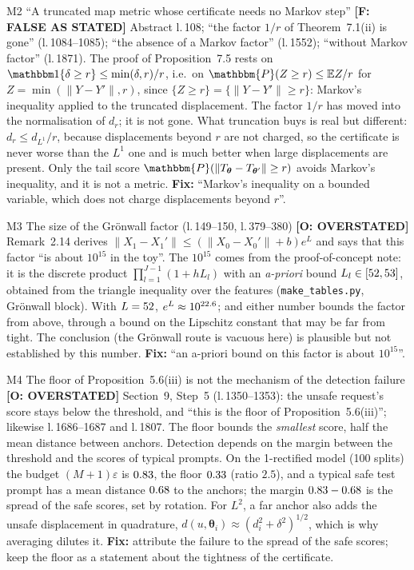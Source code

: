 \documentclass[11pt]{article}
\newcommand{\PP}{\mathbbm{P}}
\newcommand{\E}{\mathbb{E}}
\newcommand{\bth}{\boldsymbol{\theta}}
\newcommand{\file}[1]{\texttt{#1}}
\newcommand{\lin}[1]{l.\,#1}
\newcommand{\badge}[2]{\textcolor{#1}{\textbf{[#2]}}}
\newcommand{\Sfalse}{\badge{errRed}{F: FALSE AS STATED}}
\newcommand{\Sover}{\badge{warnOr}{O: OVERSTATED}}
\begin{document}
\begin{findbox}{M2 \quad ``A truncated map metric whose certificate needs no Markov step'' \hfill \Sfalse}
Abstract \lin{108}; ``the factor $1/r$ of Theorem~7.1(ii) is gone'' (\lin{1084--1085}); ``the absence of a Markov factor''
(\lin{1552}); ``without Markov factor'' (\lin{1871}). The proof of Proposition~7.5 rests on
$\mathbbm1\{\delta\ge r\}\le\min(\delta,r)/r$, i.e.\ on $\PP(Z\ge r)\le\E Z/r$ for $Z=\min(\|Y-Y'\|,r)$, since $\{Z\ge r\}=\{\|Y-Y'\|\ge r\}$:
Markov's inequality applied to the truncated displacement. The factor $1/r$ has moved into the normalisation of $d_r$; it is not
gone. What truncation buys is real but different: $d_r\le d_{L^1}/r$, because displacements beyond $r$ are not charged, so the
certificate is never worse than the $L^1$ one and is much better when large displacements are present. Only the tail score
$\PP(\|T_{\bth}-T_{\bth'}\|\ge r)$ avoids Markov's inequality, and it is not a metric. \textbf{Fix:} ``Markov's inequality on a bounded
variable, which does not charge displacements beyond $r$''.
\end{findbox}

\begin{findbox}{M3 \quad The size of the Gr\"onwall factor (\lin{149--150}, \lin{379--380}) \hfill \Sover}
Remark~2.14 derives $\|X_1-X_1'\|\le(\|X_0-X_0'\|+b)e^L$ and says that this factor ``is about $10^{15}$ in the toy''. The
$10^{15}$ comes from the proof-of-concept note: it is the discrete product $\prod_{l=1}^{J-1}(1+hL_l)$ with an \emph{a-priori} bound
$L_l\in[52,53]$, obtained from the triangle inequality over the features (\file{make\_tables.py}, Gr\"onwall block). With $L=52$,
$e^L\approx10^{22.6}$; and either number bounds the factor from above, through a bound on the Lipschitz constant that may be far from
tight. The conclusion (the Gr\"onwall route is vacuous here) is plausible but not established by this number. \textbf{Fix:} ``an
a-priori bound on this factor is about $10^{15}$''.
\end{findbox}

\begin{findbox}{M4 \quad The floor of Proposition~5.6(iii) is not the mechanism of the detection failure \hfill \Sover}
Section~9, Step~5 (\lin{1350--1353}): the unsafe request's score stays below the threshold, and ``this is the floor of
Proposition~5.6(iii)''; likewise \lin{1686--1687} and \lin{1807}. The floor bounds the \emph{smallest} score, half the mean
distance between anchors. Detection depends on the margin between the threshold and the scores of typical prompts. On the
1-rectified model (100 splits) the budget $(M+1)\varepsilon$ is $0.83$, the floor $0.33$ (ratio $2.5$), and a typical safe
test prompt has a mean distance $0.68$ to the anchors; the margin $0.83-0.68$ is the spread of the safe scores,
set by rotation. For $L^2$, a far anchor also adds the unsafe displacement in quadrature,
$d(u,\bth_i)\approx(d_i^2+\delta^2)^{1/2}$, which is why averaging dilutes it. \textbf{Fix:} attribute the failure to the spread of
the safe scores; keep the floor as a statement about the tightness of the certificate.
\end{findbox}
\end{document}
